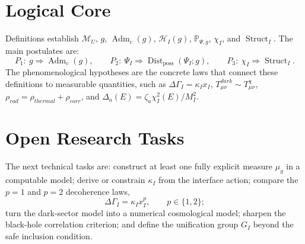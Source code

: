 \documentclass[12pt,a4paper]{article}
\DeclareMathOperator{\Adm}{Adm}
\DeclareMathOperator{\Struct}{Struct}
\DeclareMathOperator{\Dist}{Dist}
\newcommand{\M}{\mathcal M_U}
\newcommand{\Hilb}{\mathcal H}
\newcommand{\Prob}{\mathbb P}
\begin{document}
\section{Logical Core}
Definitions establish $\M$, $g$, $\Adm_c(g)$, $\Hilb_I(g)$, $\Prob_{\Psi,g}$, $\chi_I$, and $\Struct_I$. The main postulates are:
\[
\boxed{P_1:\ g\Rightarrow\Adm_c(g),}
\qquad
\boxed{P_2:\ \Psi_I\Rightarrow\Dist_{\mathrm{poss}}(\Psi_I;g),}
\qquad
\boxed{P_3:\ \chi_I\Rightarrow\Struct_I.}
\]
The phenomenological hypotheses are the concrete laws that connect these definitions to measurable quantities, such as $\Delta\Gamma_I=\kappa_Ix_I$, $T_{\mu\nu}^{dark}\sim T_{\mu\nu}^{\chi}$, $\rho_{rad}=\rho_{thermal}+\rho_{corr}$, and $\Delta_a(E)=\zeta_a\chi_I^2(E)/M_I^2$.

\section{Open Research Tasks}
The next technical tasks are: construct at least one fully explicit measure $\mu_g$ in a computable model; derive or constrain $\kappa_I$ from the interface action; compare the $p=1$ and $p=2$ decoherence laws,
\[
\Delta\Gamma_I=\kappa_Ix_I^p,
\qquad p\in\{1,2\};
\]
turn the dark-sector model into a numerical cosmological model; sharpen the black-hole correlation criterion; and define the unification group $G_I$ beyond the safe inclusion condition.
\end{document}
